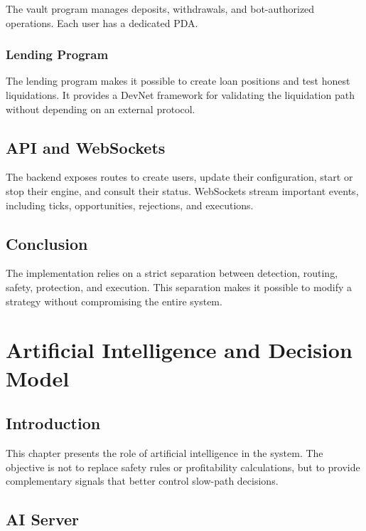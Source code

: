 \documentclass[12pt,a4paper]{report}
\begin{document}
The vault program manages deposits, withdrawals, and bot-authorized operations. Each user has a dedicated PDA.

\subsection{Lending Program}

The lending program makes it possible to create loan positions and test honest liquidations. It provides a DevNet framework for validating the liquidation path without depending on an external protocol.

\section{API and WebSockets}

The backend exposes routes to create users, update their configuration, start or stop their engine, and consult their status. WebSockets stream important events, including ticks, opportunities, rejections, and executions.

\section{Conclusion}

The implementation relies on a strict separation between detection, routing, safety, protection, and execution. This separation makes it possible to modify a strategy without compromising the entire system.

\chapter{Artificial Intelligence and Decision Model}
\label{chap:ai}

\section{Introduction}

This chapter presents the role of artificial intelligence in the system. The objective is not to replace safety rules or profitability calculations, but to provide complementary signals that better control slow-path decisions.

\section{AI Server}
\end{document}
